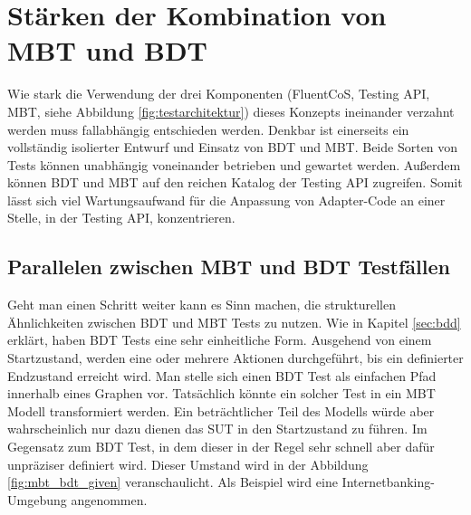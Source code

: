 \section{Stärken der Kombination von MBT und BDT}
\label{sec:mbt_bdt}

Wie stark die Verwendung der drei Komponenten (FluentCoS, Testing API, MBT, siehe Abbildung \ref{fig:testarchitektur}) dieses Konzepts ineinander verzahnt werden muss fallabhängig entschieden werden. Denkbar ist einerseits ein vollständig isolierter Entwurf und Einsatz von \Gls{BDT} und \Gls{MBT}. Beide Sorten von Tests können unabhängig voneinander betrieben und gewartet werden. Außerdem können \Gls{BDT} und \Gls{MBT} auf den reichen Katalog der Testing API zugreifen. Somit lässt sich viel Wartungsaufwand für die Anpassung von Adapter-Code an einer Stelle, in der Testing API, konzentrieren.

\subsection{Parallelen zwischen MBT und BDT Testfällen}
\label{sec:mbt_bdt_parallelen}

Geht man einen Schritt weiter kann es Sinn machen, die strukturellen Ähnlichkeiten zwischen \Gls{BDT} und \Gls{MBT} Tests zu nutzen. Wie in Kapitel \ref{sec:bdd} erklärt, haben \Gls{BDT} Tests eine sehr einheitliche Form. Ausgehend von einem Startzustand, werden eine oder mehrere Aktionen durchgeführt, bis ein definierter Endzustand erreicht wird. Man stelle sich einen \Gls{BDT} Test als einfachen Pfad innerhalb eines Graphen vor. Tatsächlich könnte ein solcher Test in ein \Gls{MBT} Modell transformiert werden. Ein beträchtlicher Teil des Modells würde aber wahrscheinlich nur dazu dienen das \Gls{SUT} in den Startzustand zu führen. Im Gegensatz zum \Gls{BDT} Test, in dem dieser in der Regel sehr schnell aber dafür unpräziser definiert wird. Dieser Umstand wird in der Abbildung \ref{fig:mbt_bdt_given} veranschaulicht. Als Beispiel wird eine Internetbanking-Umgebung angenommen.

